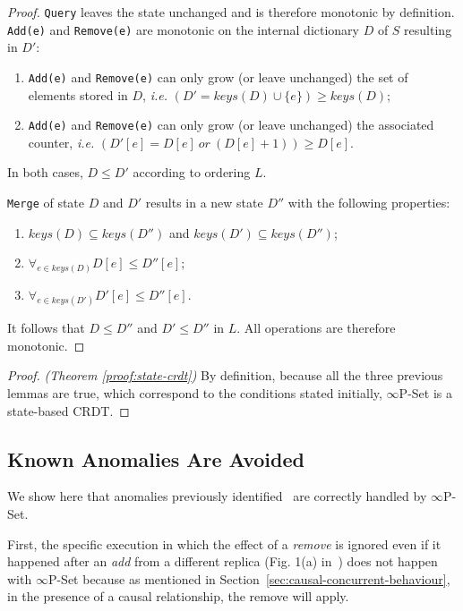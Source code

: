 \documentclass[11pt, oneside]{article}   	%
\begin{document}
\begin{proof}
\texttt{Query} leaves the state unchanged and is therefore monotonic by definition. \texttt{Add(e)} and \texttt{Remove(e)} are monotonic on the internal dictionary $D$ of $S$ resulting in $D'$: 
\begin{enumerate}
    \item \texttt{Add(e)} and \texttt{Remove(e)} can only grow (or leave unchanged) the set of elements stored in $D$, \textit{i.e.} $(D' = \textit{keys}(D) \cup \{ e \}) \geq \textit{keys}(D)$; 
    \item \texttt{Add(e)} and \texttt{Remove(e)} can only grow (or leave unchanged) the associated counter, \textit{i.e.} $(D'[e] = D[e] ~\textit{or}~ (D[e] + 1)) \geq D[e]$. 
\end{enumerate}
In both cases, $D \leq D'$ according to ordering $L$.

\texttt{Merge} of state $D$ and $D'$ results in a new state $D''$ with the following properties:
\begin{enumerate}
    \item $\textit{keys}(D) \subseteq \textit{keys}(D'')$ and $\textit{keys}(D') \subseteq \textit{keys}(D'')$;
    \item $\forall_{e \in \textit{keys}(D)} D[e] \leq D''[e]$; 
    \item $\forall_{e \in \textit{keys}(D')} D'[e] \leq D''[e]$.
\end{enumerate}
It follows that $D \leq D''$ and $D' \leq D''$ in $L$. All operations are therefore monotonic.
\end{proof}

\begin{proof}
\textit{(Theorem \ref{proof:state-crdt})}
By definition, because all the three previous lemmas are true, which correspond to the conditions stated initially, $\infty$P-Set is a state-based CRDT.
\end{proof} 

\subsection{Known Anomalies Are Avoided}

We show here that anomalies previously identified~\cite{bieniusa:hal-00769554} are correctly handled by $\infty$P-Set. 

First, the specific execution in which the effect of a \textit{remove} is ignored even if it happened after an \textit{add} from a different replica (Fig. 1(a) in~\cite{bieniusa:hal-00769554}) does not happen with $\infty$P-Set because as mentioned in Section~\ref{sec:causal-concurrent-behaviour}, in the presence of a causal relationship, the remove will apply.
\end{document}
